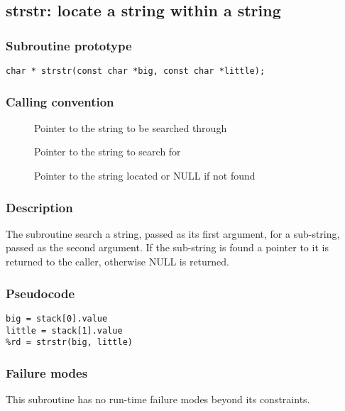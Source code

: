 \clearpage
{}
{}
\label{subr:strstr}
\subsection*{strstr: locate a string within a string}

\subsubsection*{Subroutine prototype}

\begin{verbatim}
char * strstr(const char *big, const char *little);
\end{verbatim}

\subsubsection*{Calling convention}

\begin{description}
\item[] Pointer to the string to be searched through
\item[] Pointer to the string to search for
\item[] Pointer to the string located or NULL if not found
\end{description}

\subsubsection*{Description}

The  subroutine search a string, passed as its first
argument, for a sub-string, passed as the second argument. If the
sub-string is found a pointer to it is returned to the caller,
otherwise NULL is returned.

\subsubsection*{Pseudocode}

\begin{verbatim}
big = stack[0].value
little = stack[1].value
%rd = strstr(big, little)
\end{verbatim}

\subsubsection*{Failure modes}

This subroutine has no run-time failure modes beyond its constraints.
